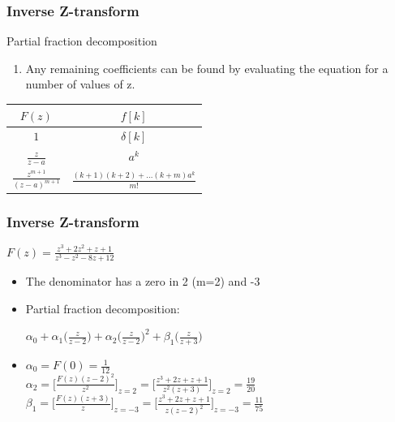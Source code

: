 \begin{frame}
	\frametitle{Inverse Z-transform}
	\begin{block}{Partial fraction decomposition}
			\begin{enumerate}
				\setcounter{enumi}{\theenumTmp}
				\item Any remaining coefficients can be found by evaluating the equation for a number of values of z.
			\end{enumerate}
				\begin{tabular}{|c|c|}
					\hline $F(z)$ & $f[k]$ \\
					\hline $1$ & $\delta[k]$ \\
					\hline $\frac{z}{z-a}$ & $ a^{k}$ \\
					\hline $\frac{z^{m+1}}{(z-a)^{m+1}}$ & $\frac{(k+1)(k+2)+ \dots (k+m)a^{k}}{m!}$ \\ 
					\hline 
				\end{tabular} 
	\end{block}

\end{frame}
\begin{frame}
	\frametitle{Inverse Z-transform}
	\begin{example}
		\footnotesize{
		\begin{center}
			$F(z) = \frac{z^3 + 2 z^2 + z +1}{z^3-z^2-8z +12}$
		\end{center}
		\vspace{-1.5 em}
		\begin{itemize}
			\item The denominator has a zero in 2 (m=2) and -3
			\item Partial fraction decomposition:
			\begin{center}
				$\alpha_0 +\alpha_1 \bigg(\frac{z}{z-2}\bigg)+ \alpha_2 \bigg(\frac{z}{z-2}\bigg)^{2} + \beta_1 \bigg(\frac{z}{z+3}\bigg)$
			\end{center}
			
			\item \begin{center}
				$\alpha_0 = F(0) = \frac{1}{12} $ \\
				$\alpha_2 =\Bigg[\frac{F(z)(z-2)^{2}}{z^2}\Bigg]_{z=2} = \Bigg[\frac{z^3+2z+z+1}{z^2(z+3)}\Bigg]_{z=2} = \frac{19}{20}$\\
				$\beta_1 =\Bigg[\frac{F(z)(z+3)}{z}\Bigg]_{z=-3} = \Bigg[\frac{z^3+2z+z+1}{z(z-2)^2}\Bigg]_{z=-3} = \frac{11}{75}$ 
			\end{center}
		
		\end{itemize}}
	\end{example}
\end{frame}
